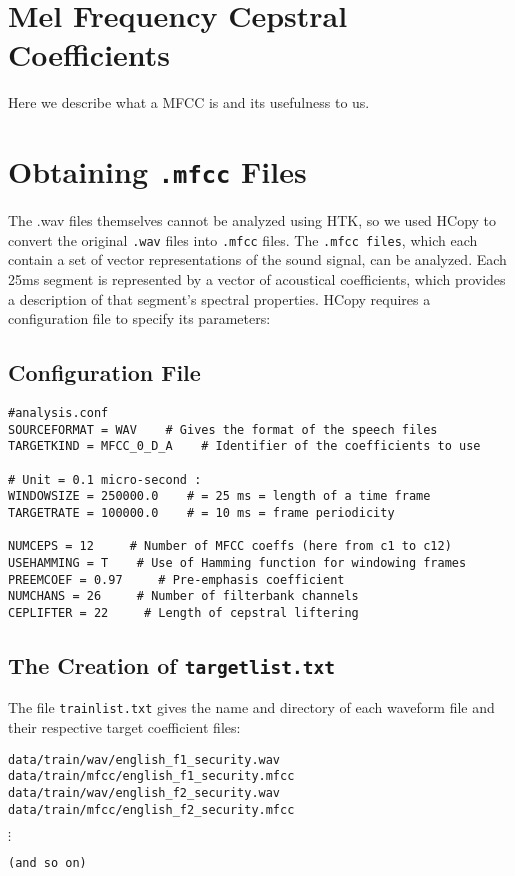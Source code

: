 \documentclass{wileySev}
\begin{document}
\section{Mel Frequency Cepstral Coefficients}
Here we describe what a MFCC is and its usefulness to us.

\section{Obtaining \texttt{.mfcc} Files}
The .wav files themselves cannot be analyzed using HTK, so we used HCopy to convert the original \texttt{.wav} files into \texttt{.mfcc} files. The \texttt{.mfcc files}, which each contain a set of vector representations of the sound signal, can be analyzed. Each 25ms segment is represented by a vector of acoustical coefficients, which provides a description of that segment's spectral properties. HCopy requires a configuration file to specify its parameters:

\subsection{Configuration File}
\begin{verbatim}
#analysis.conf
SOURCEFORMAT = WAV    # Gives the format of the speech files
TARGETKIND = MFCC_0_D_A    # Identifier of the coefficients to use

# Unit = 0.1 micro-second :
WINDOWSIZE = 250000.0    # = 25 ms = length of a time frame
TARGETRATE = 100000.0    # = 10 ms = frame periodicity

NUMCEPS = 12     # Number of MFCC coeffs (here from c1 to c12)
USEHAMMING = T    # Use of Hamming function for windowing frames
PREEMCOEF = 0.97     # Pre-emphasis coefficient
NUMCHANS = 26     # Number of filterbank channels
CEPLIFTER = 22     # Length of cepstral liftering
\end{verbatim}

\subsection{The Creation of \texttt{targetlist.txt}}

The file \texttt{trainlist.txt} gives the name and directory of each waveform file and their respective target coefficient files:
\begin{verbatim}
data/train/wav/english_f1_security.wav data/train/mfcc/english_f1_security.mfcc
data/train/wav/english_f2_security.wav data/train/mfcc/english_f2_security.mfcc
\end{verbatim}
$\vdots$
\begin{verbatim}
(and so on)
\end{verbatim}
\end{document}
